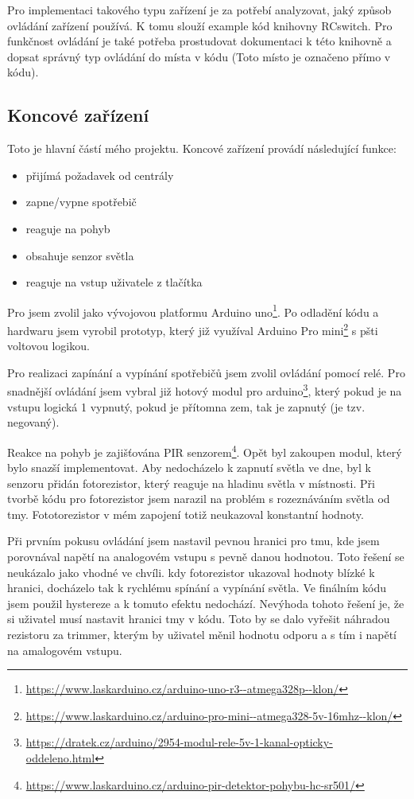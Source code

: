 \documentclass[11pt,a4paper,twoside,openright]{report}
\begin{document}
	
	Pro implementaci takového typu zařízení je za potřebí analyzovat, jaký způsob ovládání zařízení používá. K tomu slouží example kód knihovny RCswitch. Pro funkčnost ovládání je také potřeba prostudovat dokumentaci k této knihovně a dopsat správný typ ovládání do místa v kódu (Toto místo je označeno přímo v kódu).
	
	\subsection{Koncové zařízení}
	
	Toto je hlavní částí mého projektu. Koncové zařízení provádí následující funkce:
	
	\begin{itemize}
		\item přijímá požadavek od centrály
		\item zapne/vypne spotřebič
		\item reaguje na pohyb
		\item obsahuje senzor světla 
		\item reaguje na vstup uživatele z tlačítka
	\end{itemize}
	
	Pro  jsem zvolil jako vývojovou platformu Arduino uno\footnote{\url{https://www.laskarduino.cz/arduino-uno-r3--atmega328p--klon/}}. Po odladění kódu a hardwaru jsem vyrobil prototyp, který již využíval Arduino Pro mini\footnote{\url{https://www.laskarduino.cz/arduino-pro-mini--atmega328-5v-16mhz--klon/}} s pšti voltovou logikou. 
	
	
	Pro realizaci zapínání a vypínání spotřebičů jsem zvolil ovládání pomocí relé. Pro snadnější ovládání jsem vybral již hotový modul pro arduino\footnote{\url{https://dratek.cz/arduino/2954-modul-rele-5v-1-kanal-opticky-oddeleno.html}}, který pokud je na vstupu logická 1 vypnutý, pokud je přítomna zem, tak je zapnutý (je tzv. negovaný).
	
	
	Reakce na pohyb je zajišťována PIR senzorem\footnote{\url{https://www.laskarduino.cz/arduino-pir-detektor-pohybu-hc-sr501/}}. Opět byl zakoupen modul, který bylo snazší implementovat. Aby nedocházelo k zapnutí světla ve dne, byl k senzoru přidán fotorezistor, který reaguje na hladinu světla v místnosti. Při tvorbě kódu pro fotorezistor jsem narazil na problém s rozeznáváním světla od tmy. Fototorezistor v mém zapojení totiž neukazoval konstantní hodnoty.
	
	
	Při prvním pokusu ovládání jsem nastavil pevnou hranici pro tmu, kde jsem porovnával napětí na analogovém vstupu s pevně danou hodnotou. Toto řešení se neukázalo jako vhodné ve chvíli. kdy fotorezistor ukazoval hodnoty blízké k hranici, docházelo tak k rychlému spínání a vypínání světla. Ve finálním kódu jsem použil hystereze a k tomuto efektu nedochází. Nevýhoda tohoto řešení je, že si uživatel musí nastavit hranici tmy v kódu. Toto by se dalo vyřešit náhradou rezistoru za trimmer, kterým by uživatel měnil hodnotu odporu a s tím i napětí na amalogovém vstupu.
	
\end{document}
